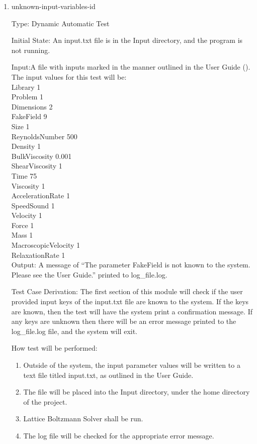 \documentclass[12pt, titlepage]{article}
\newcommand{\myprogname}{Lattice Boltzmann Solver}
\newcounter{uvtestcounter} %
\begin{document}
\begin{enumerate}
	\item{unknown-input-variables-id\theuvtestcounter\\}
	
	Type: Dynamic Automatic Test

Initial State: An input.txt file is in the Input directory, and the program is not running.

Input:A file with inputs marked in the manner outlined in the
User Guide (\citet{LBM_UserGuide_PM}).\\The input values for this test will
be:\\

Library 1\\
Problem 1\\
Dimensions 2\\
FakeField 9\\
Size 1\\
ReynoldsNumber 500\\
Density 1\\
BulkViscosity 0.001\\
ShearViscosity 1\\
Time 75\\
Viscosity 1\\
AccelerationRate 1\\
SpeedSound 1\\
Velocity 1\\
Force 1\\
Mass 1\\
MacroscopicVelocity 1\\
RelaxationRate 1\\

Output: A message of ``The parameter FakeField is not known to the system. Please see the User Guide.'' printed to log\_file.log.

Test Case Derivation: The first section of this module will check if the user provided input keys of the input.txt file are known to the system. If the keys are known, then the test will have the system print a confirmation message. If any keys are unknown then there will be an error message printed to the log\_file.log file, and the system will exit. 

How test will be performed: 
\begin{enumerate}
	\item Outside of the system, the input parameter values will be written to a text file titled input.txt, as outlined in the User Guide.
	\item The file will be placed into the Input directory, under the home directory of the project.
	\item {\myprogname} shall be run. 
	\item The log file will be checked for the appropriate error message.
\end{enumerate}
		

\end{enumerate}
\end{document}
